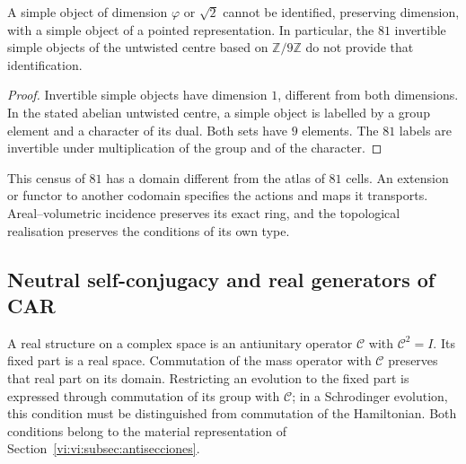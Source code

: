 \begin{proposition}
\label{vi:vi:prop:apuntada}
A simple object of dimension $\varphi$ or $\sqrt2$ cannot be identified,
preserving dimension, with a simple object of a pointed representation.
In particular, the $81$ invertible simple objects of the untwisted centre
based on $\mathbb Z/9\mathbb Z$ do not provide that identification.
\end{proposition}
\begin{proof}
Invertible simple objects have dimension $1$, different from both
dimensions. In the stated abelian untwisted centre, a simple object is
labelled by a group element and a character of its dual. Both
sets have $9$ elements. The $81$ labels are invertible
under multiplication of the group and of the character.
\end{proof}

This census of $81$ has a domain different from the atlas of $81$ cells.
An extension or functor to another codomain specifies the actions
and maps it transports. Areal--volumetric incidence preserves
its exact ring, and the topological realisation preserves the conditions
of its own type.

\subsection{Neutral self-conjugacy and real generators of CAR}
\label{vi:vi:subsec:majorana-categorias}

A real structure on a complex space is an antiunitary operator
$\mathcal C$ with $\mathcal C^2=I$. Its fixed part is a real space.
Commutation of the mass operator with $\mathcal C$ preserves that
real part on its domain. Restricting an evolution to the fixed
part is expressed through commutation of its group with $\mathcal C$;
in a Schrodinger evolution, this condition must be distinguished
from commutation of the Hamiltonian. Both conditions belong to the
material representation of Section~\ref{vi:vi:subsec:antisecciones}.

